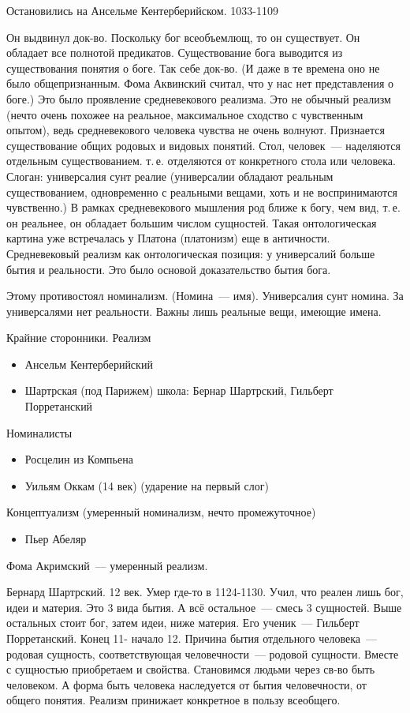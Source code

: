 Остановились на Ансельме Кентерберийском. 1033-1109

Он выдвинул док-во. Поскольку бог всеобъемлющ, то он существует. Он обладает все полнотой предикатов. Существование бога выводится из существования понятия о боге. Так себе док-во. (И даже в те времена оно не было общепризнанным. Фома Аквинский считал, что у нас нет представления о боге.) 
Это было проявление средневекового реализма. Это не обычный реализм (нечто очень похожее на реальное, максимальное сходство с чувственным опытом), ведь средневекового человека чувства не очень волнуют. Признается существование общих родовых и видовых понятий. Стол, человек~--- наделяются отдельным существованием. т.\,е. отделяются от конкретного стола или человека. Слоган: универсалия сунт реалие (универсалии обладают реальным существованием, одновременно с реальными вещами, хоть и не воспринимаются чувственно.) В рамках средневекового мышления род ближе к богу, чем вид, т.\,е. он реальнее, он обладает большим числом сущностей. Такая онтологическая картина уже встречалась у Платона (платонизм) еще в античности. Средневековый реализм как онтологическая позиция: у универсалий больше бытия и реальности. Это было основой доказательство бытия бога.

Этому противостоял номинализм. (Номина~--- имя). Универсалия сунт номина. За универсалями нет реальности. Важны лишь реальные вещи, имеющие имена.

Крайние сторонники.
Реализм

\begin{itemize}
	\item Ансельм Кентерберийский
	\item Шартрская (под Парижем) школа: Бернар Шартрский, Гильберт Порретанский
\end{itemize}

Номиналисты
\begin{itemize}
	\item Росцелин из Компьена
	\item Уильям Оккам (14 век) (ударение на первый слог) 
\end{itemize}

Концептуализм (умеренный номинализм, нечто промежуточное) 
\begin{itemize}
	\item Пьер Абеляр
\end{itemize}
Фома Акримский~--- умеренный реализм.

Бернард Шартрский. 12 век. Умер где-то в 1124-1130. Учил, что реален лишь бог, идеи и материя. Это 3 вида бытия. А всё остальное~--- смесь 3 сущностей. Выше остальных стоит бог, затем идеи, ниже материя.
Его ученик~--- Гильберт Порретанский. Конец 11- начало 12. Причина бытия отдельного человека~--- родовая сущность, соответствующая человечности~--- родовой сущности. Вместе с сущностью приобретаем и свойства. Становимся людьми через св-во быть человеком. А форма быть человека наследуется от бытия человечности, от общего понятия. Реализм принижает конкретное в пользу всеобщего.

